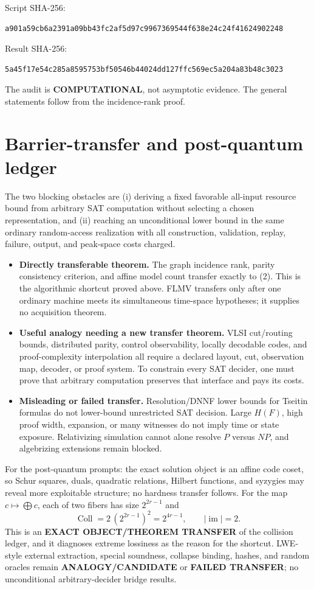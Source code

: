 \documentclass[11pt]{article}
\newcommand{\COMP}{\textbf{COMPUTATIONAL}}
\begin{document}
Script SHA-256:
\begin{verbatim}
a901a59cb6a2391a09bb43fc2af5d97c9967369544f638e24c24f41624902248
\end{verbatim}
Result SHA-256:
\begin{verbatim}
5a45f17e54c285a8595753bf50546b44024dd127ffc569ec5a204a83b48c3023
\end{verbatim}
The audit is \COMP, not asymptotic evidence.  The general statements follow from the incidence-rank proof.

\section{Barrier-transfer and post-quantum ledger}

The two blocking obstacles are (i) deriving a fixed favorable all-input resource bound from arbitrary SAT computation without selecting a chosen representation, and (ii) reaching an unconditional lower bound in the same ordinary random-access realization with all construction, validation, replay, failure, output, and peak-space costs charged.

\begin{itemize}
\item \textbf{Directly transferable theorem.}  The graph incidence rank, parity consistency criterion, and affine model count transfer exactly to (2).  This is the algorithmic shortcut proved above.  FLMV transfers only after one ordinary machine meets its simultaneous time-space hypotheses; it supplies no acquisition theorem.
\item \textbf{Useful analogy needing a new transfer theorem.}  VLSI cut/routing bounds, distributed parity, control observability, locally decodable codes, and proof-complexity interpolation all require a declared layout, cut, observation map, decoder, or proof system.  To constrain every SAT decider, one must prove that arbitrary computation preserves that interface and pays its costs.
\item \textbf{Misleading or failed transfer.}  Resolution/DNNF lower bounds for Tseitin formulas do not lower-bound unrestricted SAT decision.  Large $H(F)$, high proof width, expansion, or many witnesses do not imply time or state exposure.  Relativizing simulation cannot alone resolve $P$ versus $NP$, and algebrizing extensions remain blocked.
\end{itemize}

For the post-quantum prompts: the exact solution object is an affine code coset, so Schur squares, duals, quadratic relations, Hilbert functions, and syzygies may reveal more exploitable structure; no hardness transfer follows.  For the map $c\mapsto\bigoplus c$, each of two fibers has size $2^{2r-1}$ and
\[
 \operatorname{Coll}=2\,(2^{2r-1})^2=2^{4r-1},\qquad |\operatorname{im}|=2.
\tag{10}
\]
This is an \textbf{EXACT OBJECT/THEOREM TRANSFER} of the collision ledger, and it diagnoses extreme lossiness as the reason for the shortcut.  LWE-style external extraction, special soundness, collapse binding, hashes, and random oracles remain \textbf{ANALOGY/CANDIDATE} or \textbf{FAILED TRANSFER}; no unconditional arbitrary-decider bridge results.
\end{document}
